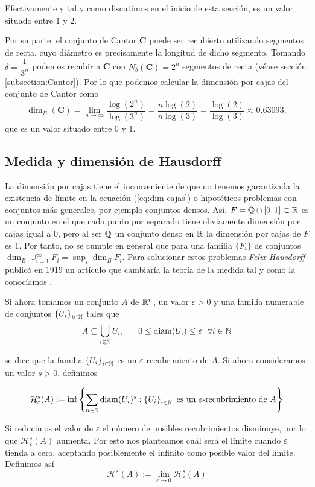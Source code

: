 Efectivamente y tal y como discutimos en el inicio de esta sección, es un valor situado entre 1 y 2.

Por su parte, el conjunto de Cantor \textbf{C} puede ser recubierto utilizando segmentos de recta, cuyo diámetro es precisamente la longitud de dicho segmento. Tomando $\delta=\dfrac{1}{3^n}$ podemos recubir a \textbf{C} con $N_\delta(\mathbf{C})=2^n$ segmentos de recta (véase sección \ref{subsection:Cantor}). Por lo que podemos calcular la dimensión por cajas del conjunto de Cantor como
$$
\dim_B(\mathbf{C})=\lim_{n\rightarrow\infty}\dfrac{\log(2^{n})}{\log(3^n)} = \dfrac{n\log(2)}{n\log(3)}=\dfrac{\log(2)}{\log(3)}\approx 0.63093,
$$
que es un valor situado entre 0 y 1.

\subsection{Medida y dimensión de Hausdorff}
\label{subsection:dim-Hausdorff}

La dimensión por cajas tiene el inconveniente de que no tenemos garantizada la existencia de límite en la ecuación (\ref{eq:dim-cajas}) o hipotéticos problemas con conjuntos más generales, por ejemplo conjuntos densos. Así, $F=\mathbb{Q}\cap[0,1]\subset\mathbb{R}$ es un conjunto en el que cada punto por separado tiene obviamente dimensión por cajas igual a 0, pero al ser $\mathbb{Q}$ un conjunto denso en $\mathbb{R}$ la dimensión por cajas de $F$ es $1$. Por tanto, no se cumple en general que para una familia $\{F_i\}$ de conjuntos $\dim_B\cup_{i=1}^\infty F_i = \sup_i\dim_B F_i$. Para solucionar estos problemas \textit{Felix Hausdorff} publicó en 1919 un artículo que cambiaría la teoría de la medida tal y como la conocíamos \cite{Hausdorff1919}. 


Si ahora tomamos un conjunto $A$ de $\mathbb{R}^n$, un valor $\varepsilon>0$ y una familia numerable de conjuntos $\left\lbrace U_i\right\rbrace_{i\in\mathbb{N}}$  tales que 
$$
A\subseteq\bigcup_{i\in\N} U_i, \ \ \ \ \ 0\leq\diam(U_i)\leq\varepsilon \ \ \forall i\in \N
$$

se dice que la familia $\left\lbrace U_i\right\rbrace_{i\in\mathbb{N}}$ es un $\varepsilon$-recubrimiento de $A$. Si ahora consideramos un valor $s>0$, definimos

$$
\mathcal{H}_\varepsilon^s(A):=\inf\left\lbrace\sum_{n\in\mathbb{N}} \mathrm{diam}(U_i)^s: \left\lbrace U_i\right\rbrace_{i\in\mathbb{N}} \text{ es un }\varepsilon\text{-recubrimiento de }A\right\rbrace
$$

Si reducimos el valor de $\varepsilon$ el número de posibles recubrimientos disminuye, por lo que $\mathcal{H}_\varepsilon^s(A)$ aumenta. Por esto nos planteamos cuál será el límite cuando $\varepsilon$ tienda a cero, aceptando posiblemente el infinito como posible valor del límite. Definimos así 
$$
\mathcal{H}^s(A) := \lim_{\varepsilon\rightarrow 0}\mathcal{H}_\varepsilon^s(A)
$$

